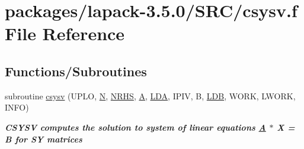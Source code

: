 \hypertarget{csysv_8f}{}\section{packages/lapack-\/3.5.0/\+S\+R\+C/csysv.f File Reference}
\label{csysv_8f}
\subsection*{Functions/\+Subroutines}
\begin{DoxyCompactItemize}
\item 
subroutine \hyperlink{group__complexSYsolve_ga7bfdf654eb5b41b318d5b8b3be55f575}{csysv} (U\+P\+L\+O, \hyperlink{polmisc_8c_a0240ac851181b84ac374872dc5434ee4}{N}, \hyperlink{example__user_8c_aa0138da002ce2a90360df2f521eb3198}{N\+R\+H\+S}, \hyperlink{classA}{A}, \hyperlink{example__user_8c_ae946da542ce0db94dced19b2ecefd1aa}{L\+D\+A}, I\+P\+I\+V, B, \hyperlink{example__user_8c_a50e90a7104df172b5a89a06c47fcca04}{L\+D\+B}, W\+O\+R\+K, L\+W\+O\+R\+K, I\+N\+F\+O)
\begin{DoxyCompactList}\small\item\em {\bfseries  C\+S\+Y\+S\+V computes the solution to system of linear equations \hyperlink{classA}{A} $\ast$ X = B for S\+Y matrices} \end{DoxyCompactList}\end{DoxyCompactItemize}
